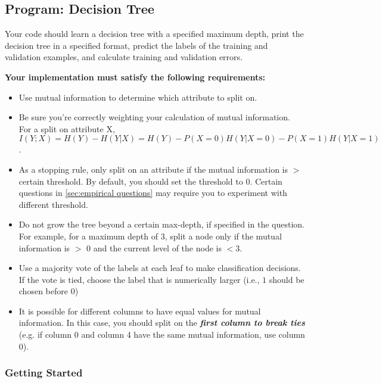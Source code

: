 \newpage
\subsection{Program: Decision Tree}
\label{sec:decisiontree}

Your code should learn a decision tree with a specified maximum depth, print the decision tree in a specified format, predict the labels of the training and validation examples, and calculate training and validation errors.


\textbf{Your implementation must satisfy the following requirements:}
\begin{itemize}
\item Use mutual information to determine which attribute to split on.
\item Be sure you’re correctly weighting your calculation of mutual information. For a split on attribute X, $I(Y;X) = H(Y)-H(Y|X) = H(Y) - P(X=0)H(Y|X = 0) - P(X = 1)H(Y|X = 1)$.
\item As a stopping rule, only split on an attribute if the mutual information is $>$ certain threshold. By default, you should set the threshold to $0$. Certain questions in \ref{sec:empirical questions} may require you to experiment with different threshold.
\item Do not grow the tree beyond a certain max-depth, if specified in the question. For example, for a maximum depth of 3, split a node only if the mutual information is $>$ 0 and the current level of the node is $< 3$.
\item Use a majority vote of the labels at each leaf to make classification decisions. If the vote is tied, choose the label that is numerically larger (i.e., $1$ should be chosen before $0$)
\item It is possible for different columns to have equal values for mutual information. In this case, you should split on the \emph{\textbf{first column to break ties}} (e.g. if column 0 and column 4 have the same mutual information, use column 0).
\end{itemize}

\subsubsection{Getting Started}
\label{sec:getting started}

